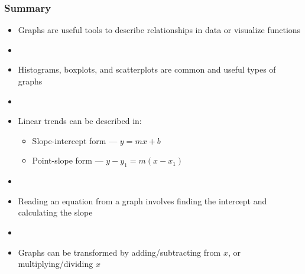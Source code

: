 \documentclass[11pt, hyperref={colorlinks, urlcolor=blue}]{beamer}
\newcommand{\myframe}[1]{\begin{frame} \frametitle{#1}}
\begin{document}
\myframe{Summary}
\begin{itemize}
\item Graphs are useful tools to describe relationships in data or visualize functions
\item[]
\item Histograms, boxplots, and scatterplots are common and useful types of graphs
\item[]
\item Linear trends can be described in:
\begin{itemize}
\item Slope-intercept form --- $y = mx + b$
\item Point-slope form --- $y - y_1 = m(x - x_1)$
\end{itemize}
\item[]
\item Reading an equation from a graph involves finding the intercept and calculating the slope
\item[]
\item Graphs can be transformed by adding/subtracting from $x$, or multiplying/dividing $x$
\end{itemize}
\end{frame}
\end{document}
